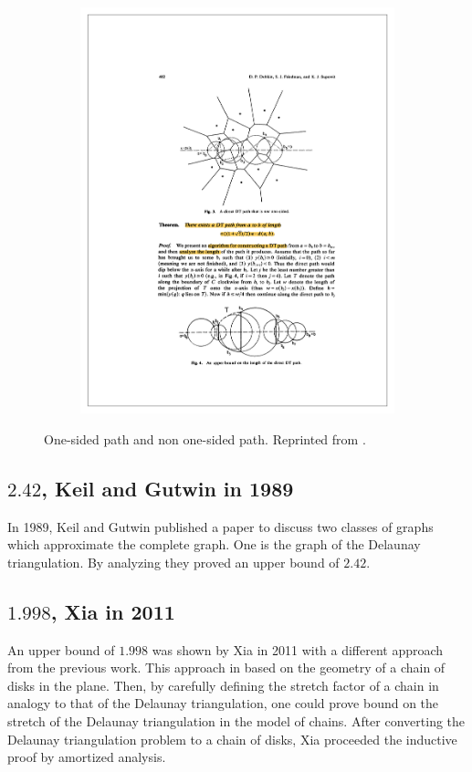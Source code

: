 \begin{figure}[ht]
\begin{subfigure}{0.48\textwidth}
\includegraphics[width=\linewidth]{Figures/DFS_b.pdf}
\caption{} \label{fig:DFS_b}
\end{subfigure}
\hspace*{\fill} %
\caption[A one-sided path and a non one-sided path]{One-sided path and non one-sided path. Reprinted from \cite{dobkin}.} \label{fig:DFS}
\end{figure}


\subsection{\texorpdfstring{$2.42$}{Lg},  Keil and Gutwin in 1989}  
In 1989,  Keil and Gutwin published a paper\cite{keil} to discuss two classes of graphs which approximate the complete graph. One is the graph of the Delaunay triangulation. By analyzing they proved an upper bound of $2.42$. 

\subsection{\texorpdfstring{$1.998$}{Lg},  Xia in 2011}  
An upper bound of $1.998$ was shown by Xia\cite{xia} in 2011 with a different approach from the previous work. This approach in based on the geometry of a chain of disks in the plane. Then, by carefully defining the stretch factor of a chain in analogy to that of  the Delaunay triangulation, one could prove bound on the stretch of the Delaunay triangulation in the model of chains. After converting the Delaunay triangulation problem to a chain of disks, Xia proceeded the inductive proof by amortized analysis.  



